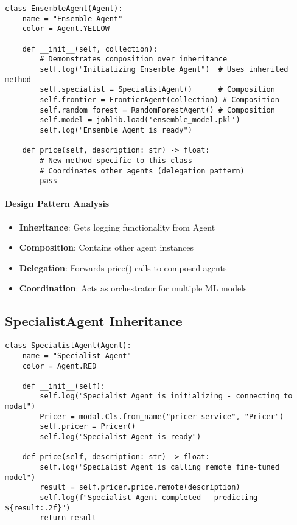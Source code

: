 \begin{lstlisting}[caption=EnsembleAgent Inheritance Pattern]
class EnsembleAgent(Agent):
    name = "Ensemble Agent"
    color = Agent.YELLOW
    
    def __init__(self, collection):
        # Demonstrates composition over inheritance
        self.log("Initializing Ensemble Agent")  # Uses inherited method
        self.specialist = SpecialistAgent()      # Composition
        self.frontier = FrontierAgent(collection) # Composition
        self.random_forest = RandomForestAgent() # Composition
        self.model = joblib.load('ensemble_model.pkl')
        self.log("Ensemble Agent is ready")

    def price(self, description: str) -> float:
        # New method specific to this class
        # Coordinates other agents (delegation pattern)
        pass
\end{lstlisting}

\paragraph{Design Pattern Analysis}
\begin{itemize}
\item \textbf{Inheritance}: Gets logging functionality from Agent
\item \textbf{Composition}: Contains other agent instances
\item \textbf{Delegation}: Forwards price() calls to composed agents
\item \textbf{Coordination}: Acts as orchestrator for multiple ML models
\end{itemize}

\subsection{SpecialistAgent Inheritance}

\begin{lstlisting}[caption=SpecialistAgent Remote Integration]
class SpecialistAgent(Agent):
    name = "Specialist Agent"
    color = Agent.RED

    def __init__(self):
        self.log("Specialist Agent is initializing - connecting to modal")
        Pricer = modal.Cls.from_name("pricer-service", "Pricer")
        self.pricer = Pricer()
        self.log("Specialist Agent is ready")
        
    def price(self, description: str) -> float:
        self.log("Specialist Agent is calling remote fine-tuned model")
        result = self.pricer.price.remote(description)
        self.log(f"Specialist Agent completed - predicting ${result:.2f}")
        return result
\end{lstlisting}

